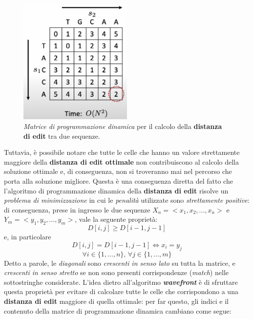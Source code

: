     \begin{figure}[ht]
        \centering
        \includegraphics[width=0.5\textwidth]{images/wfa_complete_matrix.png}
        \caption{\emph{Matrice di programmazione dinamica} per il calcolo della \textbf{distanza di edit} tra due sequenze. \cite{wfa_sequence_graph}}
        \label{fig:wfa_complete_matrix}
    \end{figure}
    \vspace{20pt}
    Tuttavia, è possibile notare che tutte le celle che hanno un valore strettamente maggiore della \textbf{distanza di edit ottimale} non contribuiscono al calcolo della soluzione ottimale e, di conseguenza, non si troveranno mai nel percorso che porta alla soluzione migliore. Questa è una conseguenza diretta del fatto che l'algoritmo di programmazione dinamica della \textbf{distanza di edit} risolve un \emph{problema di minimizzazione} in cui le \emph{penalità} utilizzate sono \emph{strettamente positive}: di conseguenza, prese in ingresso le due sequenze $X_n = <x_1, x_2, ..., x_n>$ e $Y_m = <y_1, y_2, ..., y_m>$, vale la seguente proprietà:
    \begin{equation*}
        D[i, j] \geq D[i-1, j-1]
    \end{equation*}
    e, in particolare
    \begin{equation*}
       D[i, j] = D[i-1, j-1] \iff x_i = y_j
    \end{equation*}
    $$\forall i \in \{1, ..., n\}, \, \forall j \in \{1, ..., m\}$$
    Detto a parole, le \emph{diagonali} sono \emph{crescenti in senso lato} su tutta la matrice, e \emph{crescenti in senso stretto} se non sono presenti corrispondenze (\emph{match}) nelle sottostringhe considerate. L'idea dietro all'algoritmo \textbf{\textit{wavefront}} è di sfruttare questa proprietà per evitare di calcolare tutte le celle che corrispondono a una \textbf{distanza di edit} maggiore di quella ottimale: per far questo, gli indici e il contenuto della matrice di programmazione dinamica cambiano come segue:
